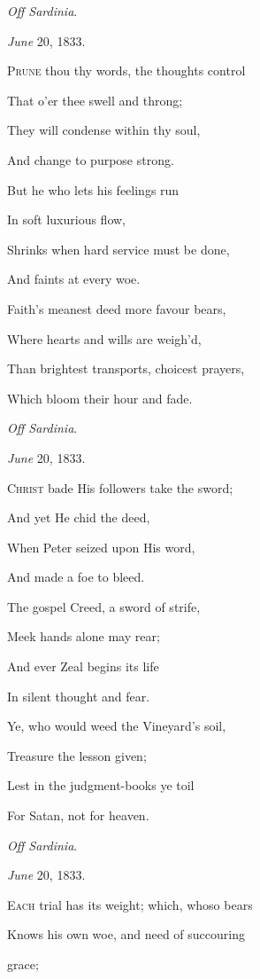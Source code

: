 \emph{Off Sardinia}.

\emph{June} 20, 1833.


P\textsc{rune} thou thy words, the thoughts control

That o'er thee swell and throng;

They will condense within thy soul,

And change to purpose strong.

But he who lets his feelings run

In soft luxurious flow,

Shrinks when hard service must be done,

And faints at every woe.

Faith's meanest deed more favour bears,

Where hearts and wills are weigh'd,

Than brightest transports, choicest prayers,

Which bloom their hour and fade.

\emph{Off Sardinia}.

\emph{June} 20, 1833.


C\textsc{hrist} bade His followers take the sword;

And yet He chid the deed,

When Peter seized upon His word,

And made a foe to bleed.

The gospel Creed, a sword of strife,

Meek hands alone may rear;

And ever Zeal begins its life

In silent thought and fear.

Ye, who would weed the Vineyard's soil,

Treasure the lesson given;

Lest in the judgment-books ye toil

For Satan, not for heaven.

\emph{Off Sardinia}.

\emph{June} 20, 1833.


E\textsc{ach} trial has its weight; which, whoso
bears

Knows his own woe,
and need of succouring

grace;


